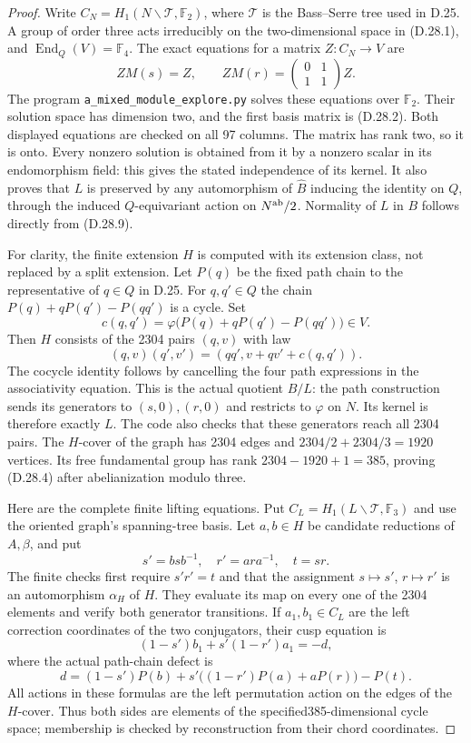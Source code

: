 \begin{proof}
Write $C_N=H_1(N\backslash\mathcal T,\mathbb F_2)$, where
$\mathcal T$ is the Bass--Serre tree used in D.25. A group
of order three acts irreducibly on the two-dimensional
space in (D.28.1), and
$\operatorname{End}_Q(V)=\mathbb F_4$. The exact equations
for a matrix $Z:C_N\to V$ are
\[
 ZM(s)=Z,\qquad ZM(r)=
       \begin{pmatrix}0&1\\1&1\end{pmatrix}Z.           \tag{D.28.9}
\]
The program \texttt{a\_mixed\_module\_explore.py} solves
these equations over $\mathbb F_2$. Their solution space
has dimension two, and the first basis matrix is (D.28.2).
Both displayed equations are checked on all 97 columns.
The matrix has rank two, so it is onto. Every nonzero
solution is obtained from it by a nonzero scalar in its
endomorphism field: this gives the stated independence
of its kernel. It also proves that $L$ is preserved by
any automorphism of $\widehat B$ inducing the identity on
$Q$, through the induced $Q$-equivariant action on
$N^{\rm ab}/2$. Normality of $L$ in $B$ follows directly
from (D.28.9).

For clarity, the finite extension $H$ is computed with its
extension class, not replaced by a split extension. Let
$P(q)$ be the fixed path chain to the representative of
$q\in Q$ in D.25. For $q,q'\in Q$ the chain
$P(q)+qP(q')-P(qq')$ is a cycle. Set
\[
 c(q,q')=\varphi\bigl(P(q)+qP(q')-P(qq')\bigr)\in V.
\]
Then $H$ consists of the 2304 pairs $(q,v)$ with law
\[
 (q,v)(q',v')=(qq',v+qv'+c(q,q')).                      \tag{D.28.10}
\]
The cocycle identity follows by cancelling the four path
expressions in the associativity equation. This is the
actual quotient $B/L$: the path construction sends its
generators to $(s,0),(r,0)$ and restricts to $\varphi$ on
$N$. Its kernel is therefore exactly $L$. The code also
checks that these generators reach all 2304 pairs.
The $H$-cover of the graph has 2304 edges and
$2304/2+2304/3=1920$ vertices. Its free fundamental group
has rank $2304-1920+1=385$, proving (D.28.4) after
abelianization modulo three.

Here are the complete finite lifting equations. Put
$C_L=H_1(L\backslash\mathcal T,\mathbb F_3)$ and use the
oriented graph's spanning-tree basis. Let $a,b\in H$ be
candidate reductions of $A,\beta$, and put
\[
 s'=bsb^{-1},\quad r'=ara^{-1},\quad t=sr.
\]
The finite checks first require $s'r'=t$ and that the
assignment $s\mapsto s'$, $r\mapsto r'$ is an automorphism
$\alpha_H$ of $H$. They evaluate its map on every one of
the 2304 elements and verify both generator transitions.
If $a_1,b_1\in C_L$ are the left correction coordinates
of the two conjugators, their cusp equation is
\[
 (1-s')b_1+s'(1-r')a_1=-d,                              \tag{D.28.11}
\]
where the actual path-chain defect is
\[
 d=(1-s')P(b)+s'\bigl((1-r')P(a)+aP(r)\bigr)-P(t).
                                                               \tag{D.28.12}
\]
All actions in these formulas are the left permutation
action on the edges of the $H$-cover. Thus both sides
are elements of the specified385-dimensional cycle
space; membership is checked by reconstruction from
their chord coordinates.


\end{proof}
